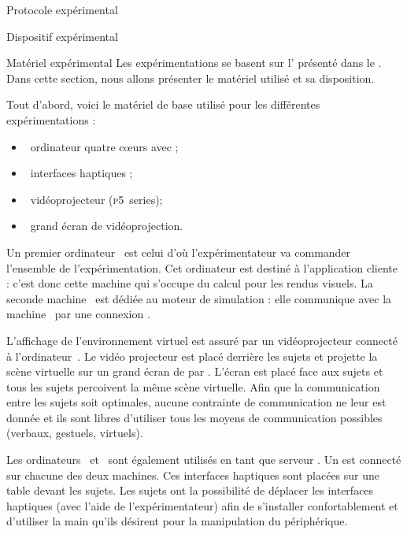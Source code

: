 \documentclass[myfrancais]{mythesis}
\begin{document}
	\myglossary
	\myappendix
	\begin{mychapter}{Protocole expérimental}
		\begin{mysection}{Dispositif expérimental}
			\begin{mysubsection}{Matériel expérimental}
				Les expérimentations se basent sur l' présenté dans le .
				Dans cette section, nous allons présenter le matériel utilisé et sa disposition.

				Tout d'abord, voici le matériel de base utilisé pour les différentes expérimentations :
				\begin{itemize}
					\item {}~ordinateur quatre cœurs \myIntelCore avec ;
					\item {}~interfaces haptiques \myOmni;
					\item {}~vidéoprojecteur \myACER (\textsc{p5}~series);
					\item {}~grand écran de vidéoprojection.
				\end{itemize}

				Un premier ordinateur~ est celui d'où l'expérimentateur va commander l'ensemble de l'expérimentation.
				Cet ordinateur est destiné à l'application cliente  : c'est donc cette machine qui s'occupe du calcul pour les rendus visuels.
				La seconde machine~ est dédiée au moteur de simulation  : elle communique avec la machine~ par une connexion \myTCPIP.

				L'affichage de l'environnement virtuel est assuré par un vidéoprojecteur connecté à l'ordinateur~.
				Le vidéo projecteur est placé derrière les sujets et projette la scène virtuelle sur un grand écran de  par .
				L'écran est placé face aux sujets et tous les sujets percoivent la même scène virtuelle.
				Afin que la communication entre les sujets soit optimales, aucune contrainte de communication ne leur est donnée et ils sont libres d'utiliser tous les moyens de communication possibles (verbaux, gestuels, virtuels\myetc).

				Les ordinateurs~ et~ sont également utilisés en tant que serveur .
				Un \myOmni est connecté sur chacune des deux machines.
				Ces interfaces haptiques sont placées sur une table devant les sujets.
				Les sujets ont la possibilité de déplacer les interfaces haptiques (avec l'aide de l'expérimentateur) afin de s'installer confortablement et d'utiliser la main qu'ils désirent pour la manipulation du périphérique.


\end{mysubsection}
\end{mysection}
\end{mychapter}
\end{document}
